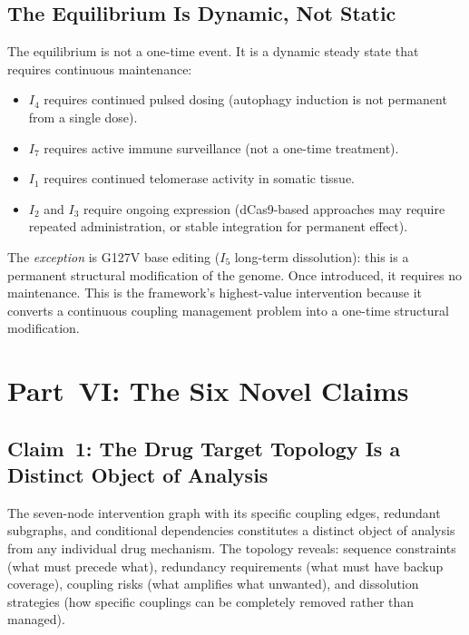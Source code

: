 \documentclass[12pt,a4paper]{article}
\newcommand{\Inet}[1]{$I_{#1}$}
\begin{document}
\subsection{The Equilibrium Is Dynamic, Not Static}

The equilibrium is not a one-time event. It is a dynamic steady state that
requires continuous maintenance:

\begin{itemize}[leftmargin=2em]
  \item \Inet{4} requires continued pulsed dosing (autophagy induction
    is not permanent from a single dose).
  \item \Inet{7} requires active immune surveillance (not a one-time
    treatment).
  \item \Inet{1} requires continued telomerase activity in somatic tissue.
  \item \Inet{2} and \Inet{3} require ongoing expression (dCas9-based
    approaches may require repeated administration, or stable integration
    for permanent effect).
\end{itemize}

The \textit{exception} is G127V base editing (\Inet{5} long-term dissolution):
this is a permanent structural modification of the genome. Once introduced,
it requires no maintenance. This is the framework's highest-value intervention
because it converts a continuous coupling management problem into a one-time
structural modification.

\section{Part~VI: The Six Novel Claims}

\subsection{Claim~1: The Drug Target Topology Is a Distinct Object of Analysis}

The seven-node intervention graph with its specific coupling edges, redundant
subgraphs, and conditional dependencies constitutes a distinct object of
analysis from any individual drug mechanism. The topology reveals: sequence
constraints (what must precede what), redundancy requirements (what must have
backup coverage), coupling risks (what amplifies what unwanted), and
dissolution strategies (how specific couplings can be completely removed
rather than managed).
\end{document}

